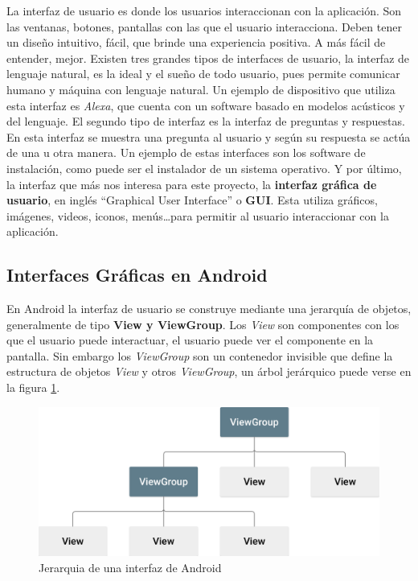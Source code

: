 La interfaz de usuario es donde los usuarios interaccionan con la aplicación. Son las ventanas, botones, pantallas con las que el usuario interacciona. Deben tener un diseño intuitivo, fácil, que brinde una experiencia positiva. A más fácil de entender, mejor. Existen tres grandes tipos de interfaces de usuario, la interfaz de lenguaje natural, es la ideal y el sueño de todo usuario, pues permite comunicar humano y máquina con lenguaje natural. Un ejemplo de dispositivo que utiliza esta interfaz es \emph{Alexa}, que cuenta con un software basado en modelos acústicos y del lenguaje. El segundo tipo de interfaz es la interfaz de preguntas y respuestas. En esta interfaz se muestra una pregunta al usuario y según su respuesta se actúa de una u otra manera. Un ejemplo de estas interfaces son los software de instalación, como puede ser el instalador de un sistema operativo. Y por último, la interfaz que más nos interesa para este proyecto, la \textbf{interfaz gráfica de usuario}, en inglés ``Graphical User Interface'' o \textbf{GUI}. Esta utiliza gráficos, imágenes, videos, iconos, menús\dots para permitir al usuario interaccionar con la aplicación. 

\subsection{Interfaces Gráficas en Android} \label{sec:GUI}

En Android la interfaz de usuario se construye mediante una jerarquía de objetos, generalmente de tipo \textbf{View y ViewGroup}. Los \emph{View} son componentes con los que el usuario puede interactuar, el usuario puede ver el componente en la pantalla. Sin embargo los \emph{ViewGroup} son un contenedor invisible que define la estructura de objetos \emph{View} y otros \emph{ViewGroup}, un árbol jerárquico puede verse en la figura \ref{fig:interfaz_android}.

\begin{figure}[h!]
  \centering
  \includegraphics[width=0.75\linewidth]{figs/Desarrollo/Jerarquia}
  \caption[Android Layout]{Jerarquia de una interfaz de Android}
  \label{fig:interfaz_android}
\end{figure}

